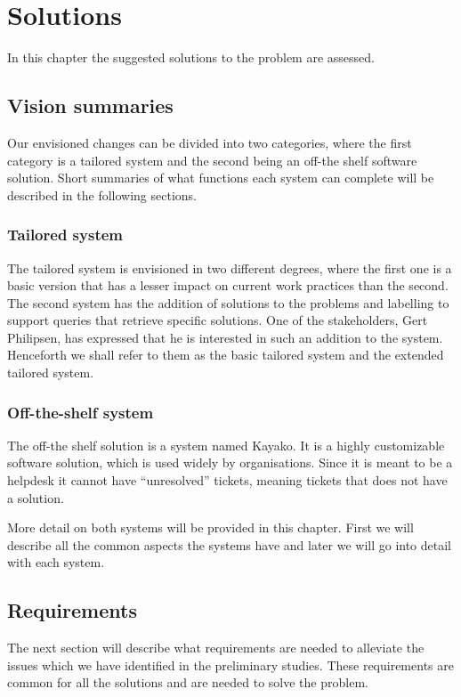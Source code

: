 \chapter{Solutions}
In this chapter the suggested solutions to the problem are assessed.

\section{Vision summaries}
Our envisioned changes can be divided into two categories, where the first category is a tailored system and the second being an off-the shelf software solution.
Short summaries of what functions each system can complete will be described in the  following sections.

\subsection{Tailored system}
The tailored system is envisioned in two different degrees, where the first one is a basic version that has a lesser impact on current work practices than the second. \\
The second system has the addition of solutions to the problems and labelling to support queries that retrieve specific solutions. One of the stakeholders, Gert Philipsen, has expressed that he is interested in such an addition to the system\cite{gert003}. \\
Henceforth we shall refer to them as the basic tailored system and the extended tailored system.
\subsection{Off-the-shelf system}
The off-the shelf solution is a system named Kayako\cite{website005}. It is a highly customizable software solution, which is used widely by organisations\cite{website006}. Since it is meant to be a helpdesk it cannot have “unresolved” tickets, meaning tickets that does not have a solution. 

More detail on both systems will be provided in this chapter. First we will describe all the common aspects the systems have and later we will go into detail with each system.

\section{Requirements}
The next section will describe what requirements are needed to alleviate the issues which we have identified in the preliminary studies. These requirements are common for all the solutions and are needed to solve the problem.
